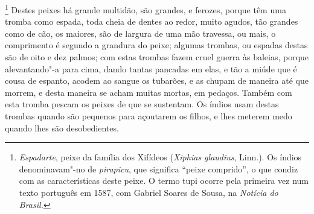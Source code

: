 \footnote{ \textit{Espadarte}, peixe da família dos
Xifídeos (\textit{Xiphias glaudius}, Linn.). Os índios denominavam"-no
de \textit{pirapicu}, que significa ``peixe comprido'', o que condiz
com as características deste peixe. O termo tupi ocorre pela primeira
vez num texto português em 1587, com Gabriel Soares de Sousa, na
\textit{Notícia do Brasil.}} Destes peixes há grande
multidão, são grandes, e ferozes, porque têm uma tromba como espada,
toda cheia de dentes ao redor, muito agudos, tão grandes como de cão,
os maiores, são de largura de uma mão travessa, ou mais, o comprimento
é segundo a grandura do peixe; algumas trombas, ou espadas destas são
de oito e dez palmos; com estas trombas fazem cruel guerra às baleias,
porque alevantando"-a para cima, dando tantas pancadas em elas, e tão a
miúde que é cousa de espanto, acodem ao sangue os tubarões, e as chupam
de maneira até que morrem, e desta maneira se acham muitas mortas, em
pedaços. Também com esta tromba pescam os peixes de que se sustentam.
Os índios usam destas trombas quando são pequenos para açoutarem os
filhos, e lhes meterem medo quando lhes são desobedientes.

